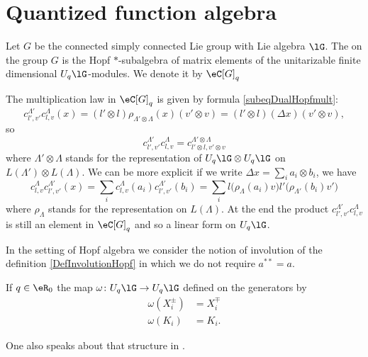 \section{Quantized function algebra}

\begin{definition}
    Let \( G\) be the connected simply connected Lie group with Lie algebra \( \lG\). The  on the group \( G\) is the Hopf \( *\)-subalgebra of matrix elements of the unitarizable finite dimensional \( U_q\lG\)-modules. We denote it by \( \eC[G]_q\)
\end{definition}

The multiplication law in \( \eC[G]_q\) is given by formula \eqref{subeqDualHopfmult}:
\begin{equation}
    c^{\Lambda'}_{l',v'}c^{\Lambda}_{l,v}(x)=(l'\otimes l)\rho_{\Lambda'\otimes \Lambda}(x)(v'\otimes v)=(l'\otimes l)(\Delta x)(v'\otimes v),
\end{equation}
so
\begin{equation}
    c^{\Lambda'}_{l',v'}c^{\Lambda}_{l,v}=c^{\Lambda'\otimes\Lambda}_{l'\otimes l,v'\otimes v}
\end{equation}
where \( \Lambda'\otimes\Lambda\) stands for the representation of \(U_q\lG\otimes U_q\lG\) on \( L(\Lambda')\otimes L(\Lambda)\). We can be more explicit if we write \( \Delta x=\sum_i a_i\otimes b_i\), we have
\begin{equation}
    c^{\Lambda}_{l,v}c^{\Lambda'}_{l',v'}(x)=\sum_i c^{\Lambda}_{l,v}(a_i)c^{\Lambda'}_{l',v'}(b_i)=\sum_il\big( \rho_{\Lambda}(a_i)v \big)l'\big( \rho_{\Lambda'}(b_i)v' \big)
\end{equation}
where \( \rho_{\Lambda}\) stands for the representation on \( L(\Lambda)\). At the end the product \( c^{\Lambda'}_{l',v'}c^{\Lambda}_{l,v}\) is still an element in \( \eC[G]_q\) and so a linear form on \( U_q\lG\).

\begin{remark}
    In the setting of Hopf algebra we consider the notion of involution of the definition \ref{DefInvolutionHopf} in which we do not require \( a^{**}=a\).
\end{remark}

\begin{proposition}
    If \( q\in\eR_0\) the map \( \omega\colon U_q\lG\to U_q\lG\) defined on the generators by
    \begin{subequations}
        \begin{align}
            \omega(X^{\pm}_{i})&=X^{\mp}_i\\
            \omega(K_i)&=K_i.
        \end{align}
    \end{subequations}
\end{proposition}
One also speaks about that structure in \cite{SoilSchubert}.


